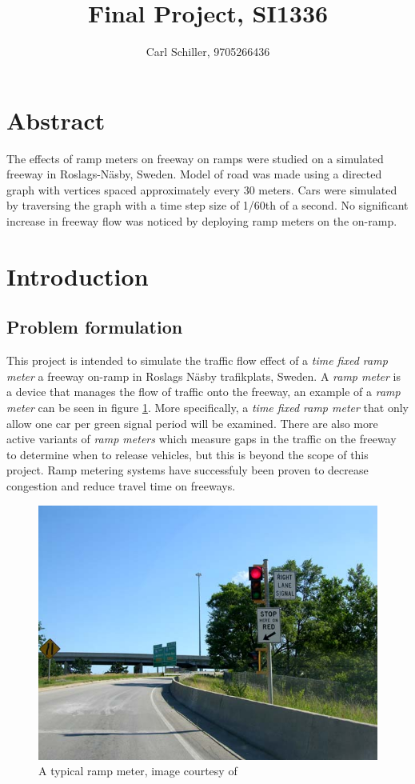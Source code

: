 \documentclass{article}
\author{Carl Schiller, 9705266436}
\title{Final Project, SI1336}
\begin{document}
\maketitle

\section*{Abstract}
  The effects of ramp meters on freeway on ramps were studied on a simulated
  freeway in Roslags-Näsby, Sweden. Model of road was made using
  a directed graph with vertices spaced approximately every 30 meters. Cars were
  simulated by traversing the graph with a time step size of 1/60th of a second.
  No significant increase in freeway flow was noticed by deploying ramp meters
  on the on-ramp.

\tableofcontents

\newpage

\section{Introduction}
  \subsection{Problem formulation}
    This project is intended to simulate the traffic flow effect of a \textit{time fixed ramp
    meter} a freeway
    on-ramp in Roslags Näsby trafikplats, Sweden. A \textit{ramp meter} is a device that
    manages the flow of traffic onto the freeway, an example of a \textit{ramp meter} can be seen in figure \ref{pic:ramp}.
    More specifically, a \textit{time fixed ramp
    meter} that only allow one car per green signal period will be examined. There are also
    more active variants of \textit{ramp meters} which measure gaps in the traffic on the freeway
    to determine when to release vehicles, but this is beyond the scope of this project.
    Ramp metering systems have successfuly been proven to decrease congestion and
    reduce travel time on freeways.
    ~\cite{u.s._department_of_transportation_federal_highway_administration_ramp_nodate}
    \begin{figure}
      \includegraphics[width=\linewidth]{"ramp meter"}
      \caption{A typical ramp meter, image courtesy of \cite{patriarca12_english:_2008}}
      \label{pic:ramp}
    \end{figure}
\end{document}
